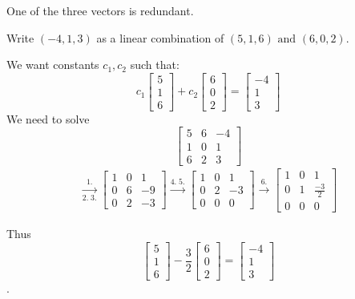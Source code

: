 \documentclass[../main.tex]{subfiles}
\begin{document}
\begin{note}
    One of the three vectors is redundant.
\end{note}

\begin{example}[]
    Write \( (-4,1,3) \) as a linear combination of \( (5,1,6) \text{ and } (6,0,2) \).

    We want constants \( c_1,c_2 \) such that:
    \[ c_1 \begin{bmatrix} 5 \\ 1 \\ 6 \end{bmatrix} + c_2 \begin{bmatrix} 6 \\ 0 \\ 2 \end{bmatrix}
    = \begin{bmatrix} -4 \\ 1 \\ 3 \end{bmatrix} \]
    We need to solve \[ \begin{bmatrix}
        5 & 6 & -4 \\
        1 & 0 & 1 \\
        6 & 2 & 3
    \end{bmatrix} \]
    \begin{gather*}
        \xrightarrow[2. \; 3.]{1.}
        \begin{bmatrix}
            1 & 0 & 1 \\
            0 & 6 & -9 \\
            0 & 2 & -3
        \end{bmatrix}
        \xrightarrow[]{4. \; 5.}
        \begin{bmatrix}
            1 & 0 & 1 \\
            0 & 2 & -3 \\
            0 & 0 & 0
        \end{bmatrix}
        \xrightarrow[]{6.}
        \begin{bmatrix}
            1 & 0 & 1 \\
            0 & 1 & \frac{-3}{2} \\
            0 & 0 & 0
        \end{bmatrix}
    \end{gather*}

    Thus \[ \begin{bmatrix} 5 \\ 1 \\ 6 \end{bmatrix} -\displaystyle \frac{3}{2} \begin{bmatrix} 6 \\ 0 \\ 2 \end{bmatrix}
    = \begin{bmatrix} -4 \\ 1 \\ 3 \end{bmatrix} \].
\end{example}
\end{document}
